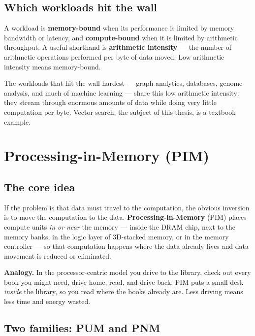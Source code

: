 \documentclass[11pt,a4paper]{article}
\newcommand{\term}[1]{\textbf{\color{slate}#1}}
\begin{document}
\subsection{Which workloads hit the wall}

A workload is \term{memory-bound} when its performance is limited by memory bandwidth or latency,
and \term{compute-bound} when it is limited by arithmetic throughput. A useful shorthand is
\term{arithmetic intensity} --- the number of arithmetic operations performed per byte of data moved.
Low arithmetic intensity means memory-bound.

The workloads that hit the wall hardest --- graph analytics, databases, genome analysis, and much of
machine learning --- share this low arithmetic intensity: they stream through enormous amounts of
data while doing very little computation per byte. Vector search, the subject of this thesis, is a
textbook example.

\section{Processing-in-Memory (PIM)}

\subsection{The core idea}

If the problem is that data must travel to the computation, the obvious inversion is to move the
computation to the data. \term{Processing-in-Memory} (PIM) places compute units \emph{in or near}
the memory --- inside the DRAM chip, next to the memory banks, in the logic layer of 3D-stacked
memory, or in the memory controller --- so that computation happens where the data already lives and
data movement is reduced or eliminated.

\begin{keybox}
\textbf{Analogy.} In the processor-centric model you drive to the library, check out every book
you might need, drive home, read, and drive back. PIM puts a small desk \emph{inside} the library,
so you read where the books already are. Less driving means less time and energy wasted.
\end{keybox}

\subsection{Two families: PUM and PNM}
\end{document}
